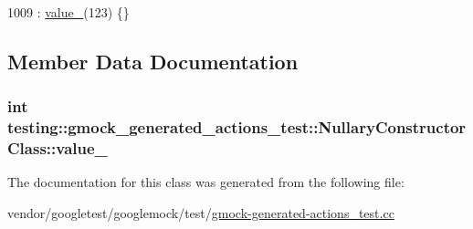 \begin{DoxyCode}
1009 : \hyperlink{classtesting_1_1gmock__generated__actions__test_1_1NullaryConstructorClass_aa877ccc5aff335cbf81b8de90abee732}{value\_}(123) \{\}
\end{DoxyCode}


\subsection{Member Data Documentation}
\subsubsection[{\texorpdfstring{value\+\_\+}{value_}}]{\setlength{\rightskip}{0pt plus 5cm}int testing\+::gmock\+\_\+generated\+\_\+actions\+\_\+test\+::\+Nullary\+Constructor\+Class\+::value\+\_\+}\hypertarget{classtesting_1_1gmock__generated__actions__test_1_1NullaryConstructorClass_aa877ccc5aff335cbf81b8de90abee732}{}\label{classtesting_1_1gmock__generated__actions__test_1_1NullaryConstructorClass_aa877ccc5aff335cbf81b8de90abee732}


The documentation for this class was generated from the following file\+:\begin{DoxyCompactItemize}
\item 
vendor/googletest/googlemock/test/\hyperlink{gmock-generated-actions__test_8cc}{gmock-\/generated-\/actions\+\_\+test.\+cc}\end{DoxyCompactItemize}
